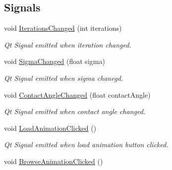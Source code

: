 \subsection*{Signals}
\begin{DoxyCompactItemize}
\item 
void \hyperlink{classImplicitSkinSettings_a4a30d8a8ad0975689931556565c70762}{Iterations\+Changed} (int iterations)\hypertarget{classImplicitSkinSettings_a4a30d8a8ad0975689931556565c70762}{}\label{classImplicitSkinSettings_a4a30d8a8ad0975689931556565c70762}

\begin{DoxyCompactList}\small\item\em Qt Signal emitted when iteration changed. \end{DoxyCompactList}\item 
void \hyperlink{classImplicitSkinSettings_acc0660b7e87c960f9673e00ac7a5e781}{Sigma\+Changed} (float sigma)\hypertarget{classImplicitSkinSettings_acc0660b7e87c960f9673e00ac7a5e781}{}\label{classImplicitSkinSettings_acc0660b7e87c960f9673e00ac7a5e781}

\begin{DoxyCompactList}\small\item\em Qt Signal emitted when sigma chanegd. \end{DoxyCompactList}\item 
void \hyperlink{classImplicitSkinSettings_aaaa5d6d175fd2c6ffb7a6e5cec53d457}{Contact\+Angle\+Changed} (float contact\+Angle)\hypertarget{classImplicitSkinSettings_aaaa5d6d175fd2c6ffb7a6e5cec53d457}{}\label{classImplicitSkinSettings_aaaa5d6d175fd2c6ffb7a6e5cec53d457}

\begin{DoxyCompactList}\small\item\em Qt Signal emitted when contact angle changed. \end{DoxyCompactList}\item 
void \hyperlink{classImplicitSkinSettings_a874064fa151df9adf093561fb09b7fa4}{Load\+Animation\+Clicked} ()\hypertarget{classImplicitSkinSettings_a874064fa151df9adf093561fb09b7fa4}{}\label{classImplicitSkinSettings_a874064fa151df9adf093561fb09b7fa4}

\begin{DoxyCompactList}\small\item\em Qt Signal emitted when load animation button clicked. \end{DoxyCompactList}\item 
void \hyperlink{classImplicitSkinSettings_a6c25ea84730485ab8cc07e13b1f9e14c}{Browse\+Animation\+Clicked} ()\hypertarget{classImplicitSkinSettings_a6c25ea84730485ab8cc07e13b1f9e14c}{}\label{classImplicitSkinSettings_a6c25ea84730485ab8cc07e13b1f9e14c}


\end{DoxyCompactItemize}
